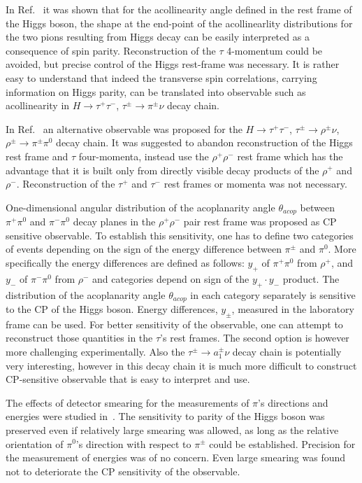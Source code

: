 \documentclass[12pt]{article}
\begin{document}
In Ref.~\cite{Kramer:1994jn} it was shown that for the acollinearity angle defined in the rest frame 
of the Higgs boson,  the shape at the end-point of the acollinearlity 
distributions for the two pions resulting from Higgs decay can be easily interpreted as
a consequence of spin parity. Reconstruction of the $\tau$ 4-momentum could be avoided,
but precise control of the Higgs rest-frame was necessary. 
It is rather easy to understand that indeed the 
transverse spin correlations, carrying information on Higgs parity, 
can be translated into observable such as acollinearity in $H \to \tau^+ \tau^-$, 
$\tau^\pm \to \pi^\pm \nu$ decay chain.  

In Ref.~\cite{Bower:2002zx} an alternative observable was proposed for 
 the $H \to \tau^+ \tau^-$, $\tau^\pm \to \rho^\pm \nu$,
$\rho^\pm \to \pi^\pm \pi^0$ decay chain. It was suggested to abandon reconstruction of the 
Higgs rest frame and $\tau$ four-momenta, instead use the $\rho^+ \rho^-$ rest frame which has the advantage
that it is built only from directly visible decay products of the  $\rho^+$ and $ \rho^-$. 
Reconstruction of the $\tau^+$ and  $\tau^-$ rest frames or momenta was not necessary.


One-dimensional angular distribution of the acoplanarity angle $\theta_{acop}$ 
between $\pi^+ \pi^0$  and $\pi^- \pi^0$ decay planes in the $\rho^+ \rho^-$ pair rest 
frame was proposed as CP sensitive observable. To establish this sensitivity, one has to define two categories
of events depending on the sign of the energy difference between $\pi^\pm$ and $ \pi^0$.
More specifically  the energy differences are defined as follows: 
 $y_+$  of $\pi^+ \pi^0$ from $\rho^+$, and $y_-$ 
of $\pi^- \pi^0$ from $\rho^-$ and categories depend on sign of the $y_+ \cdot y_- $  product.
The distribution of  the acoplanarity angle $\theta_{acop}$  
in each category separately is sensitive to the CP of the Higgs boson. 
Energy differences,  $y_\pm$,  measured in the laboratory frame can be used. 
For better sensitivity of the observable, one can attempt to reconstruct those quantities in 
 the $\tau$'s rest frames. The second option is however more challenging experimentally. Also
the  $\tau^\pm \to a_1^\pm \nu$ decay chain is potentially very interesting, however 
in this decay chain it is much more difficult to construct CP-sensitive observable that is easy to interpret and use.


The effects of detector smearing for the measurements of $\pi$'s directions
and energies were studied in~\cite{Bower:2002zx}. The sensitivity to parity of the Higgs boson was preserved
even if relatively large smearing was allowed, as long as the relative orientation
of  $\pi^0$'s direction with respect to $ \pi^\pm$ could be established.
Precision for the measurement of energies was of no concern. Even large smearing
was found not to deteriorate the CP sensitivity of the observable. 
\end{document}

